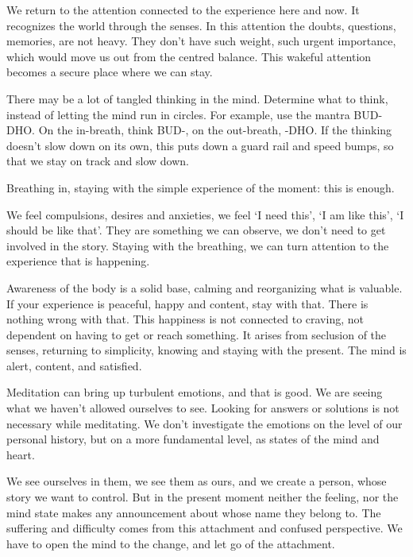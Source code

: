 We return to the attention connected to the experience here and now. It
recognizes the world through the senses. In this attention the doubts,
questions, memories, are not heavy. They don't have such weight, such
urgent importance, which would move us out from the centred balance.
This wakeful attention becomes a secure place where we can stay.

There may be a lot of tangled thinking in the mind. Determine what to
think, instead of letting the mind run in circles. For example, use the
mantra BUD-DHO. On the in-breath, think BUD-, on the out-breath, -DHO.
If the thinking doesn't slow down on its own, this puts down a guard
rail and speed bumps, so that we stay on track and slow down.


Breathing in, staying with the simple experience of the moment: this is
enough.

We feel compulsions, desires and anxieties, we feel `I need this', `I am
like this', `I should be like that'. They are something we can observe,
we don't need to get involved in the story. Staying with the breathing,
we can turn attention to the experience that is happening.

Awareness of the body is a solid base, calming and reorganizing what is
valuable. If your experience is peaceful, happy and content, stay with
that. There is nothing wrong with that. This happiness is not connected
to craving, not dependent on having to get or reach something. It arises
from seclusion of the senses, returning to simplicity, knowing and
staying with the present. The mind is alert, content, and satisfied.

\clearpage

Meditation can bring up turbulent emotions, and that is good. We are
seeing what we haven't allowed ourselves to see. Looking for answers or
solutions is not necessary while meditating. We don't investigate the
emotions on the level of our personal history, but on a more fundamental
level, as states of the mind and heart.

We see ourselves in them, we see them as ours, and we create a person,
whose story we want to control. But in the present moment neither the
feeling, nor the mind state makes any announcement about whose name they
belong to. The suffering and difficulty comes from this attachment and
confused perspective. We have to open the mind to the change, and let go
of the attachment.

